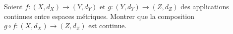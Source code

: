 
\begin{exercice}\label{exo0084}

Soient $f \colon (X,d_X) \to (Y,d_Y)$ et $g \colon (Y,d_Y) \to (Z,d_Z)$ des applications continues entre espaces métriques.  Montrer que la composition $g \circ f \colon (X,d_X) \to (Z,d_Z)$ est continue.

\end{exercice}
